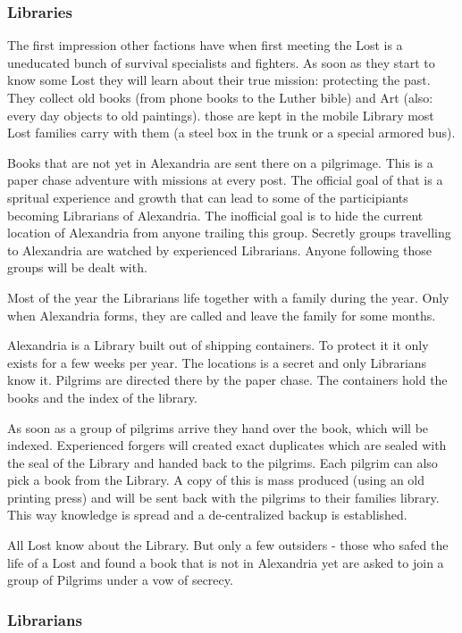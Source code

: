 \subsubsection{Libraries}

The first impression other factions have when first meeting the Lost is a uneducated bunch of survival specialists and fighters. As soon as they start to know some Lost they will learn about their true mission: protecting the past. They collect old books (from phone books to the Luther bible) and Art (also: every day objects to old paintings).
those are kept in the mobile Library most Lost families carry with them (a steel box in the trunk or a special armored bus).

Books that are not yet in Alexandria are sent there on a pilgrimage. This is a paper chase adventure with missions at every post. The official goal of that is a spritual experience and growth that can lead to some of the participiants becoming Librarians of Alexandria. The inofficial goal is to hide the current location of Alexandria from anyone trailing this group.
Secretly groups travelling to Alexandria are watched by experienced Librarians. Anyone following those groups will be dealt with.

Most of the year the Librarians life together with a family during the year. Only when Alexandria forms, they are called and leave the family for some months.

Alexandria is a Library built out of shipping containers. To protect it it only exists for a few weeks per year. The locations is a secret and only Librarians know it. Pilgrims are directed there by the paper chase. The containers hold the books and the index of the library.

As soon as a group of pilgrims arrive they hand over the book, which will be indexed. Experienced forgers will created exact duplicates which are sealed with the seal of the Library and handed back to the pilgrims. Each pilgrim can also pick a book from the Library. A copy of this is mass produced (using an old printing press) and will be sent back with the pilgrims to their families library.
This way knowledge is spread and a de-centralized backup is established.

All Lost know about the Library. But only a few outsiders - those who safed the life of a Lost and found a book that is not in Alexandria yet are asked to join a group of Pilgrims under a vow of secrecy.

\subsubsection{Librarians}

